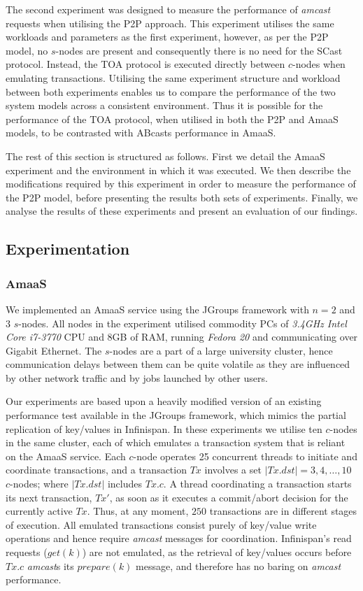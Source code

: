    The second experiment was designed to measure the performance of \emph{amcast} requests when utilising the P2P approach.  This experiment utilises the same workloads and parameters as the first experiment, however, as per the P2P model, no $s$-nodes are present and consequently there is no need for the \textsf{SCast} protocol.  Instead, the TOA protocol is executed directly between $c$-nodes when emulating transactions.  Utilising the same experiment structure and workload between both experiments enables us to compare the performance of the two system models across a consistent environment.  Thus it is possible for the performance of the TOA protocol, when utilised in both the P2P and \textsf{AmaaS} models, to be contrasted with \textsf{ABcast}s performance in \textsf{AmaaS}.  
	
	The rest of this section is structured as follows.  First we detail the \textsf{AmaaS} experiment and the environment in which it was executed.  We then describe the modifications required by this experiment in order to measure the performance of the P2P model, before presenting the results both sets of experiments.  Finally, we analyse the results of these experiments and present an evaluation of our findings.  
		
	\subsection{Experimentation}
	\subsubsection*{AmaaS}
	We implemented an \textsf{AmaaS} service using the JGroups\citep{JGroups} framework with $n=2$ and $3$ $s$-nodes.  All nodes in the experiment utilised commodity PCs of \emph{3.4GHz Intel Core i7-3770} CPU and 8GB of RAM, running \emph{Fedora 20} and communicating over Gigabit Ethernet. The $s$-nodes are a part of a large university cluster, hence communication delays between them can be quite volatile as they are influenced by other network traffic and by jobs launched by other users.
	
	Our experiments are based upon a heavily modified version of an existing performance test available in the JGroups\citep{JGroups} framework, which mimics the partial replication of key/values in Infinispan\citep{Infinispan}.  In these experiments we utilise ten $c$-nodes in the same cluster, each of which emulates a transaction system that is reliant on the \textsf{AmaaS} service.  Each $c$-node operates 25 concurrent threads to initiate and coordinate transactions, and a transaction $Tx$ involves a set $|Tx.dst| = 3,4,\ldots,10$ $c$-nodes; where $|Tx.dst|$ includes $Tx.c$. A thread coordinating a transaction starts its next transaction, $Tx'$, as soon as it executes a commit/abort decision for the currently active $Tx$. Thus, at any moment, $250$ transactions are in different stages of execution.  All emulated transactions consist purely of key/value write operations and hence require \emph{amcast} messages for coordination.  Infinispan's read requests ($get(k)$) are not emulated, as the retrieval of key/values occurs before $Tx.c$ \emph{amcast}s its $prepare(k)$ message, and therefore has no baring on \emph{amcast} performance.  
	
